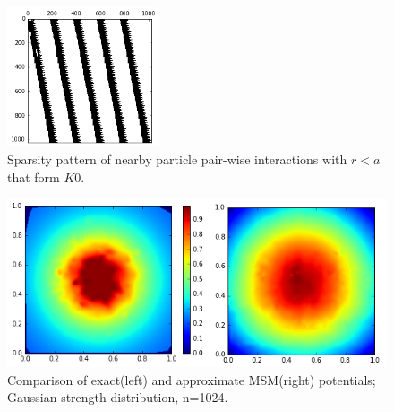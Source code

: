 \documentclass[review]{siamart}
\begin{document}
\begin{figure}[!htb]
\centering
\includegraphics[width=0.4\textwidth]{K0.PNG}
\caption{Sparsity pattern of nearby particle pair-wise interactions with $r<a$ that form $K0$.}
\end{figure}

\begin{figure}[!htb]
\centering
\includegraphics[width=1\textwidth]{UgComp.PNG}
\caption{Comparison of exact(left) and approximate MSM(right) potentials; Gaussian strength distribution, n=1024.}
\end{figure}

\newpage

\end{document}
